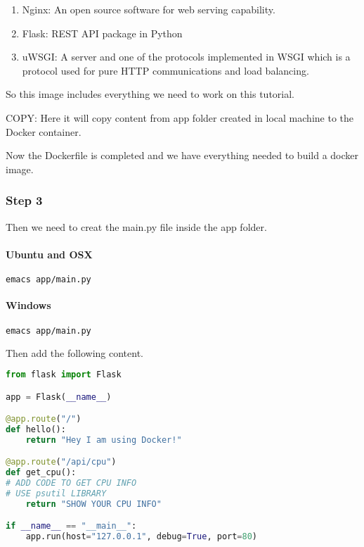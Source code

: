 \begin{enumerate}
\item
  Nginx: An open source software for web serving capability.
\item
  Flask: REST API package in Python
\item
  uWSGI: A server and one of the protocols implemented in WSGI which is
  a protocol used for pure HTTP communications and load balancing.
\end{enumerate}

So this image includes everything we need to work on this tutorial.

COPY: Here it will copy content from app folder created in local machine
to the Docker container.

Now the Dockerfile is completed and we have everything needed to build a
docker image.

\subsubsection{Step 3}

Then we need to creat the main.py file inside the app folder.

\paragraph{Ubuntu and OSX}

\begin{lstlisting}[language=bash]
emacs app/main.py
\end{lstlisting}

\paragraph{Windows}

\begin{lstlisting}[language=bash]
emacs app/main.py
\end{lstlisting}

Then add the following content.

\begin{lstlisting}[language=python]
from flask import Flask

app = Flask(__name__)

@app.route("/")
def hello():
    return "Hey I am using Docker!"

@app.route("/api/cpu")
def get_cpu():
# ADD CODE TO GET CPU INFO
# USE psutil LIBRARY
    return "SHOW YOUR CPU INFO"

if __name__ == "__main__":
    app.run(host="127.0.0.1", debug=True, port=80)
\end{lstlisting}

